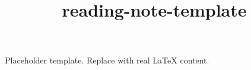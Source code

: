 ﻿\documentclass{article}
\title{reading-note-template}
\begin{document}
\maketitle
Placeholder template. Replace with real LaTeX content.
\end{document}
